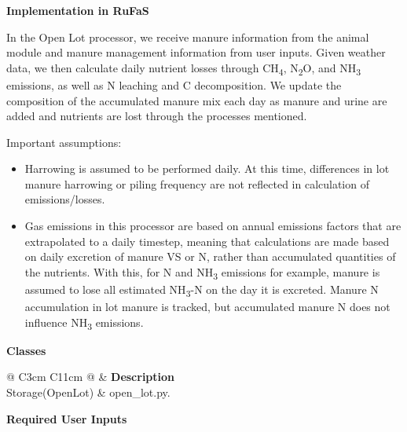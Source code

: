 \begin{refsection}
    \textbf{Implementation in RuFaS}
        \vspace{0.2cm}

    In the Open Lot processor, we receive manure information from the animal module and manure management information from user inputs. Given weather data, we then calculate daily nutrient losses through CH\textsubscript{4}, N\textsubscript{2}O, and NH\textsubscript{3} emissions, as well as N leaching and C decomposition. We update the composition of the accumulated manure mix each day as manure and urine are added and nutrients are lost through the processes mentioned.
        \vspace{0.2cm}

    Important assumptions:
    \begin{itemize}
        \item Harrowing is assumed to be performed daily. At this time, differences in lot manure harrowing or piling frequency are not reflected in calculation of emissions/losses.
        \item Gas emissions in this processor are based on annual emissions factors that are extrapolated to a daily timestep, meaning that calculations are made based on daily excretion of manure VS or N, rather than accumulated quantities of the nutrients. With this, for N and NH\textsubscript{3} emissions for example, manure is assumed to lose all estimated NH\textsubscript{3}-N on the day it is excreted. Manure N accumulation in lot manure is tracked, but accumulated manure N does not influence NH\textsubscript{3} emissions.
    \end{itemize}
    
\newpage
\textbf{Classes}
\vspace{0.2cm}
    \begin{table}[h!]
    \centering
    \renewcommand{\arraystretch}{1.3}
    \caption{Classes available in open lots.}
    \begin{tabular}{@{} C{3cm} C{11cm}  @{}}
    \toprule
    \textbf{ } & \textbf{Description}   \\
    \midrule
    Storage(OpenLot)  & open\_lot.py.
 \\
    \bottomrule
    \end{tabular}
    \end{table} 
    \vspace{.5cm}

\textbf{Required User Inputs }\\

    \begin{table}[h!]
    \centering
    \renewcommand{\arraystretch}{1.3}
    \begin{center}
        \caption{Required inputs for the open lots section}
    \end{center}
    \vspace{-0.15cm}
    

\end{table}
\end{refsection}
